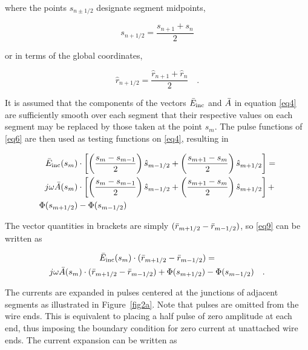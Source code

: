 \documentclass[12pt]{article}
\begin{document}
where the points $s_{n\pm1/2}$ designate segment midpoints,

\begin{equation}
s_{n+1/2} = \frac{s_{n+1} + s_n}{2}
\label{eq7}
\end{equation}

or in terms of the global coordinates,

\begin{equation}
\hat{r}_{n+1/2} = \frac{\hat{r}_{n+1} + \hat{r}_n}{2}
\quad.
\label{eq8}
\end{equation}

It is assumed that the components of the vectors $\bar{E}_{\mathrm{inc}}$
and $\bar{A}$ in equation \eqref{eq4} are sufficiently smooth over each
segment that their respective values on each segment may be replaced by
those taken at the point $s_m$. The pulse functions of \eqref{eq6} are
then used as testing functions on \eqref{eq4}, resulting in

\begin{equation}
\begin{aligned}
\bar{E}_{\mathrm{inc}}(s_m)&\cdot
\left[\left(\frac{s_m-s_{m-1}}{2}\right)\hat{s}_{m-1/2}
+ \left(\frac{s_{m+1} - s_m}{2}\right)\hat{s}_{m+1/2}\right] = \\
j\omega\bar{A}(s_m)&\cdot
\left[\left(\frac{s_m-s_{m-1}}{2}\right)\hat{s}_{m-1/2}
+ \left(\frac{s_{m+1}-s_m}{2}\right)\hat{s}_{m+1/2}\right] + \\
\Phi(s_{m+1/2}) &- \Phi(s_{m-1/2}) \\
\end{aligned}
\label{eq9}
\end{equation}

The vector quantities in brackets are simply
$(\bar{r}_{m+1/2} - \bar{r}_{m-1/2})$,
so \eqref{eq9} can be written as

\begin{equation}
\begin{gathered}
\bar{E}_{\mathrm{inc}}(s_m)\cdot(\bar{r}_{m+1/2}-\bar{r}_{m-1/2}) = \\
j\omega\bar{A}(s_m)\cdot(\bar{r}_{m+1/2}-\bar{r}_{m-1/2})
+\Phi(s_{m+1/2}) - \Phi(s_{m-1/2})
\quad.
\end{gathered}
\label{eq10}
\end{equation}

The currents are expanded in pulses centered at the junctions of
adjacent segments as illustrated in Figure~\ref{fig2a}. Note that pulses
are omitted from the wire ends. This is equivalent to placing a half
pulse of zero amplitude at each end, thus imposing the boundary
condition for zero current at unattached wire ends. The current
expansion can be written as
\end{document}
